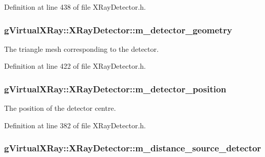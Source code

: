 Definition at line 438 of file XRayDetector.h.

\hypertarget{classg_virtual_x_ray_1_1_x_ray_detector_a2090842d641ea37cc03fd7da384c8c67}{
\subsubsection[{m\_\-detector\_\-geometry}]{ {\bf gVirtualXRay::XRayDetector::m\_\-detector\_\-geometry}}}
\label{classg_virtual_x_ray_1_1_x_ray_detector_a2090842d641ea37cc03fd7da384c8c67}


The triangle mesh corresponding to the detector. 



Definition at line 422 of file XRayDetector.h.

\hypertarget{classg_virtual_x_ray_1_1_x_ray_detector_af60ca47a7687066d3c474146a4a9f85a}{
\subsubsection[{m\_\-detector\_\-position}]{ {\bf gVirtualXRay::XRayDetector::m\_\-detector\_\-position}}}
\label{classg_virtual_x_ray_1_1_x_ray_detector_af60ca47a7687066d3c474146a4a9f85a}


The position of the detector centre. 



Definition at line 382 of file XRayDetector.h.

\hypertarget{classg_virtual_x_ray_1_1_x_ray_detector_a3b6ebd87b12d0fb434671309d252a00c}{
\subsubsection[{m\_\-distance\_\-source\_\-detector}]{ {\bf gVirtualXRay::XRayDetector::m\_\-distance\_\-source\_\-detector}}}
\label{classg_virtual_x_ray_1_1_x_ray_detector_a3b6ebd87b12d0fb434671309d252a00c}


